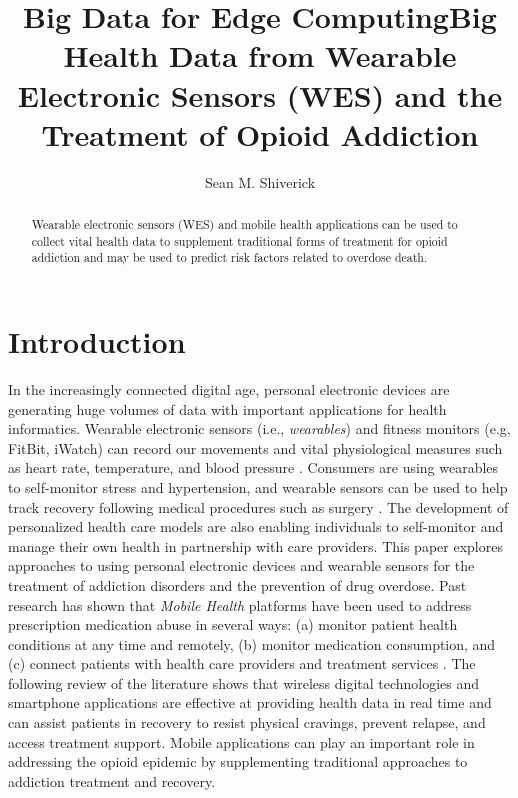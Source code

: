 \documentclass[sigconf]{acmart}
\begin{document}
\title{Big Data for Edge Computing}

\title{Big Health Data from Wearable Electronic Sensors (WES) and 
the Treatment of Opioid Addiction}

\author{Sean M. Shiverick}

\begin{abstract}
Wearable electronic sensors (WES) and mobile health applications can be used to
collect vital health data to supplement traditional forms of treatment for opioid
addiction and may be used to predict risk factors related to overdose death. 
\end{abstract}


\maketitle

\section{Introduction}

In the increasingly connected digital age, personal electronic devices are 
generating huge volumes of data with important applications for health 
informatics. Wearable electronic sensors (i.e., \emph{wearables}) and fitness 
monitors (e.g, FitBit, iWatch) can record our movements and vital physiological 
measures such as heart rate, temperature, and blood pressure \cite{metcalf16}. 
Consumers are using wearables to self-monitor stress and hypertension, and 
wearable sensors can be used to help track recovery following medical procedures 
such as surgery \cite{atallah11}. The development of personalized health care 
models are also enabling individuals to self-monitor and manage their own health 
in partnership with care providers. This paper explores approaches to using 
personal electronic devices and wearable sensors for the treatment of addiction 
disorders and the prevention of drug overdose. Past research has shown that 
\emph{Mobile Health} platforms have been used to address prescription medication 
abuse in several ways: (a) monitor patient health conditions at any time and 
remotely, (b) monitor medication consumption, and (c) connect patients with 
health care providers and treatment services \cite{Varshney14}. The following 
review of the literature shows that wireless digital technologies and smartphone
applications are effective at providing health data in real time and can assist 
patients in recovery to resist physical cravings, prevent relapse, and access 
treatment support. Mobile applications can play an important role in addressing 
the opioid epidemic by supplementing traditional approaches to addiction treatment 
and recovery. 
\end{document}

